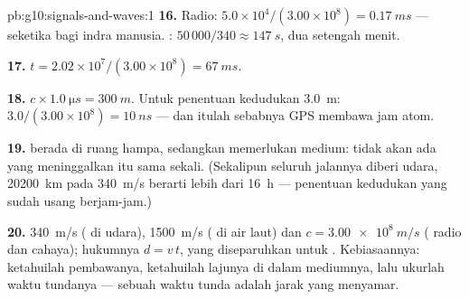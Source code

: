 \begin{solution}{pb:g10:signals-and-waves:1}
\textbf{16.} Radio: $5.0\times10^{4}/(3.00\times10^{8}) =
\qty{0.17}{ms}$ --- seketika bagi indra manusia. :
$50\,000/340 \approx \qty{147}{s}$, dua setengah menit.

\textbf{17.} $t = 2.02\times10^{7}/(3.00\times10^{8}) = \qty{67}{ms}$.

\textbf{18.} $c \times \qty{1.0}{\micro s} = \qty{300}{m}$. Untuk
penentuan kedudukan \qty{3.0}{m}:
$3.0/(3.00\times10^{8}) = \qty{10}{ns}$ --- dan itulah sebabnya 
GPS membawa jam atom.

\textbf{19.}  berada di ruang hampa, sedangkan  memerlukan
medium: tidak akan ada  yang meninggalkan  itu sama
sekali. (Sekalipun seluruh jalannya diberi udara, \qty{20200}{km} pada
\qty{340}{m/s} berarti lebih dari \qty{16}{h} --- penentuan kedudukan
yang sudah usang berjam-jam.)

\textbf{20.} \qty{340}{m/s} ( di udara), \qty{1500}{m/s} ( di
air laut) dan $c = \qty{3.00e8}{m/s}$ ( radio dan cahaya);
hukumnya $d = v\,t$, yang diseparuhkan untuk . Kebiasaannya:
ketahuilah pembawanya, ketahuilah lajunya di dalam mediumnya, lalu
ukurlah waktu tundanya --- sebuah waktu tunda adalah jarak yang
menyamar.
\end{solution}
